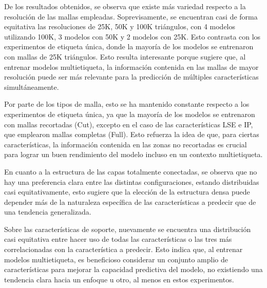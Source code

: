 De los resultados obtenidos, se observa que existe más variedad respecto a la resolución de las mallas empleadas. Soprevisamente, se encuentran casi de forma equitativa las resoluciones de 25K, 50K y 100K triángulos, con 4 modelos utilizando 100K, 3 modelos con 50K y 2 modelos con 25K. Esto contrasta con los experimentos de etiqueta única, donde la mayoría de los modelos se entrenaron con mallas de 25K triángulos. Esto resulta interesante porque sugiere que, al entrenar modelos multietiqueta, la información contenida en las mallas de mayor resolución puede ser más relevante para la predicción de múltiples características simultáneamente.

Por parte de los tipos de malla, esto se ha mantenido constante respecto a los experimentos de etiqueta única, ya que la mayoría de los modelos se entrenaron con mallas recortadas (Cut), excepto en el caso de las características LSE e IP, que emplearon mallas completas (Full). Esto refuerza la idea de que, para ciertas características, la información contenida en las zonas no recortadas es crucial para lograr un buen rendimiento del modelo incluso en un contexto multietiqueta.

En cuanto a la estructura de las capas totalmente conectadas, se observa que no hay una preferencia clara entre las distintas configuraciones, estando distribuidas casi equitativamente, esto sugiere que la elección de la estructura densa puede depender más de la naturaleza específica de las características a predecir que de una tendencia generalizada.

Sobre las características de soporte, nuevamente se encuentra una distribución casi equitativa entre hacer uso de todas las características o las tres más correlacionadas con la característica a predecir. Esto indica que, al entrenar modelos multietiqueta, es beneficioso considerar un conjunto amplio de características para mejorar la capacidad predictiva del modelo, no existiendo una tendencia clara hacia un enfoque u otro, al menos en estos experimentos.

